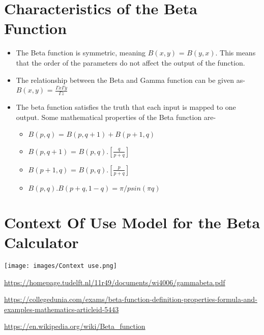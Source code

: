 \documentclass{article}
\begin{document}
\section{Characteristics of the Beta Function}
    \begin{itemize}
        \item The Beta function is symmetric, meaning $B(x,y)$ = $B(y,x)$. This means that the order of the parameters do not affect the output of the function.
        \item The relationship between the Beta and Gamma function can be given as- $B(x,y)$ = $\frac{\Gamma x\Gamma y} {\Gamma z}$ \cite{wikipedia}
        \item The beta function satisfies the truth that each input is mapped to one output.
       Some mathematical properties of the Beta function are-
        \begin{itemize}
            \item $B(p, q)$ = $B(p, q+1) + B(p+1, q)$ 
            \item $B(p, q+1)$ = $B(p, q). [\frac{q}{p+q}]$
            \item $B(p+1, q)$ = $B(p, q). [\frac{p}{p+q}]$
            \item $B(p, q). B (p+q, 1-q) = \pi/ p sin (\pi q)$
        \end{itemize}
    \end{itemize}

\section{Context Of Use Model for the Beta Calculator}
\begin{center}
   \texttt{[image: images/Context use.png]}
    \end{center}

\begin{thebibliography}{9}
\url{https://homepage.tudelft.nl/11r49/documents/wi4006/gammabeta.pdf}

\url{https://collegedunia.com/exams/beta-function-definition-properties-formula-and-examples-mathematics-articleid-5443}

\url{https://en.wikipedia.org/wiki/Beta\_function}
\end{thebibliography}
    
\end{document}

